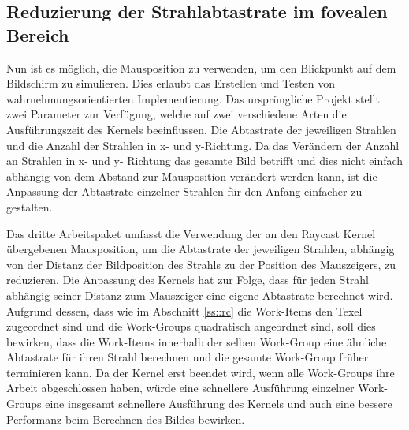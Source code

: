 \subsection{Reduzierung der Strahlabtastrate im fovealen Bereich}
Nun ist es möglich, die Mausposition zu verwenden, um den Blickpunkt auf dem Bildschirm zu simulieren.
Dies erlaubt das Erstellen und Testen von wahrnehmungsorientierten Implementierung. 
Das ursprüngliche Projekt stellt zwei Parameter zur Verfügung, welche auf zwei verschiedene Arten die Ausführungszeit des Kernels beeinflussen.
Die Abtastrate der jeweiligen Strahlen und die Anzahl der Strahlen in x- und y-Richtung.
Da das Verändern der Anzahl an Strahlen in x- und y- Richtung das gesamte Bild betrifft und dies nicht einfach abhängig von dem Abstand zur Mausposition verändert werden kann, ist die Anpassung der Abtastrate einzelner Strahlen für den Anfang einfacher zu gestalten.

Das dritte Arbeitspaket umfasst die Verwendung der an den Raycast Kernel übergebenen Mausposition, um die Abtastrate der jeweiligen Strahlen, abhängig von der Distanz der Bildposition des Strahls zu der Position des Mauszeigers, zu reduzieren.
Die Anpassung des Kernels hat zur Folge, dass für jeden Strahl abhängig seiner Distanz zum Mauszeiger eine eigene Abtastrate berechnet wird.
Aufgrund dessen, dass wie im Abschnitt \ref{ss::rc} die Work-Items den Texel zugeordnet sind und die Work-Groups quadratisch angeordnet sind, soll dies bewirken, dass die Work-Items innerhalb der selben Work-Group eine ähnliche Abtastrate für ihren Strahl berechnen und die gesamte Work-Group früher terminieren kann.
Da der Kernel erst beendet wird, wenn alle Work-Groups ihre Arbeit abgeschlossen haben, würde eine schnellere Ausführung einzelner Work-Groups eine insgesamt schnellere Ausführung des Kernels und auch eine bessere Performanz beim Berechnen des Bildes bewirken.

